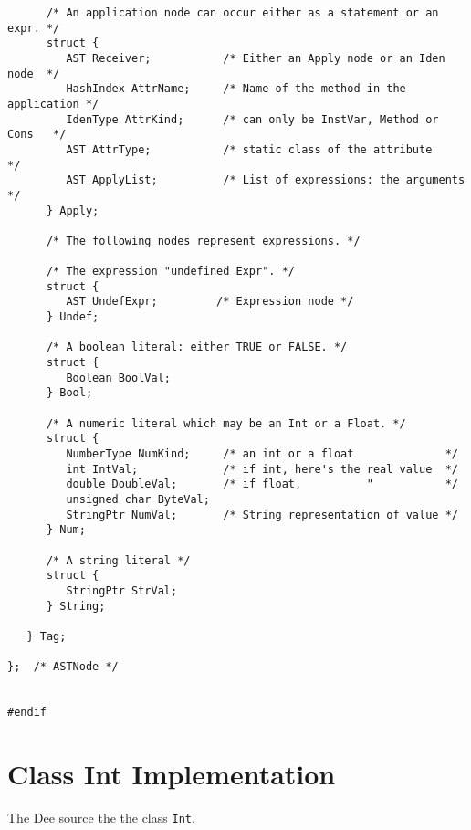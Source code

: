 {\begin{verbatim}
      /* An application node can occur either as a statement or an expr. */
      struct {
         AST Receiver;           /* Either an Apply node or an Iden node  */
         HashIndex AttrName;     /* Name of the method in the application */
         IdenType AttrKind;      /* can only be InstVar, Method or Cons   */
         AST AttrType;           /* static class of the attribute         */
         AST ApplyList;          /* List of expressions: the arguments    */
      } Apply;

      /* The following nodes represent expressions. */

      /* The expression "undefined Expr". */
      struct {
         AST UndefExpr;         /* Expression node */
      } Undef;

      /* A boolean literal: either TRUE or FALSE. */
      struct {
         Boolean BoolVal;
      } Bool;

      /* A numeric literal which may be an Int or a Float. */
      struct {
         NumberType NumKind;     /* an int or a float              */
         int IntVal;             /* if int, here's the real value  */
         double DoubleVal;       /* if float,          "           */
         unsigned char ByteVal;
         StringPtr NumVal;       /* String representation of value */
      } Num;

      /* A string literal */
      struct {
         StringPtr StrVal;
      } String;

   } Tag;

};  /* ASTNode */


#endif
\end{verbatim}}

\chapter{Class Int Implementation}


The Dee source the the class {\tt Int}.


